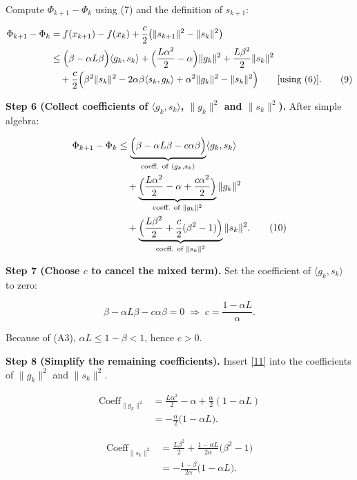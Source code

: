 \documentclass{article}
\begin{document}
Compute $\Phi_{k+1}-\Phi_{k}$ using (7) and the definition of $s_{k+1}$:

\[
\begin{aligned}
\Phi_{k+1}-\Phi_{k}
&= f(x_{k+1})-f(x_{k})+\frac{c}{2}\bigl(\|s_{k+1}\|^{2}-\|s_{k}\|^{2}\bigr)\\
&\le \Bigl(\beta-\alpha L\beta\Bigr)\langle g_{k},s_{k}\rangle
   +\Bigl(\frac{L\alpha^{2}}{2}-\alpha\Bigr)\|g_{k}\|^{2}
   +\frac{L\beta^{2}}{2}\|s_{k}\|^{2}\\
&\quad +\frac{c}{2}\Bigl(\beta^{2}\|s_{k}\|^{2}
   -2\alpha\beta\langle s_{k},g_{k}\rangle
   +\alpha^{2}\|g_{k}\|^{2}
   -\|s_{k}\|^{2}\Bigr) \qquad\text{[using (6)]}. \tag{9}
\end{aligned}
\]

\noindent\textbf{Step 6 (Collect coefficients of $\langle g_{k},s_{k}\rangle$, $\|g_{k}\|^{2}$ and $\|s_{k}\|^{2}$).}  
After simple algebra:

\[
\begin{aligned}
\Phi_{k+1}-\Phi_{k}
&\le
\underbrace{\Bigl(\beta-\alpha L\beta -c\alpha\beta\Bigr)}_{\text{coeff. of }\langle g_{k},s_{k}\rangle}\langle g_{k},s_{k}\rangle \\
&\quad
+\underbrace{\Bigl(\frac{L\alpha^{2}}{2}-\alpha+\frac{c\alpha^{2}}{2}\Bigr)}_{\text{coeff. of }\|g_{k}\|^{2}}\|g_{k}\|^{2}\\
&\quad
+\underbrace{\Bigl(\frac{L\beta^{2}}{2}+\frac{c}{2}(\beta^{2}-1)\Bigr)}_{\text{coeff. of }\|s_{k}\|^{2}}\|s_{k}\|^{2}. \tag{10}
\end{aligned}
\]

\noindent\textbf{Step 7 (Choose $c$ to cancel the mixed term).}  
Set the coefficient of $\langle g_{k},s_{k}\rangle$ to zero:

\[
\beta-\alpha L\beta-c\alpha\beta=0
\;\Longrightarrow\;
c=\frac{1-\alpha L}{\alpha}. \tag{11}
\]

Because of (A3), $\alpha L\le 1-\beta<1$, hence $c>0$.

\noindent\textbf{Step 8 (Simplify the remaining coefficients).}  
Insert \eqref{11} into the coefficients of $\|g_{k}\|^{2}$ and $\|s_{k}\|^{2}$.

\[
\begin{aligned}
\text{Coeff}_{\|g_{k}\|^{2}}
&= \frac{L\alpha^{2}}{2}-\alpha+\frac{\alpha}{2}(1-\alpha L)\\
&= -\frac{\alpha}{2}\bigl(1-\alpha L\bigr). \tag{12}
\end{aligned}
\]

\[
\begin{aligned}
\text{Coeff}_{\|s_{k}\|^{2}}
&= \frac{L\beta^{2}}{2}+\frac{1-\alpha L}{2\alpha}\bigl(\beta^{2}-1\bigr)\\
&= -\frac{1-\beta}{2\alpha}\bigl(1-\alpha L\bigr). \tag{13}
\end{aligned}
\]
\end{document}
